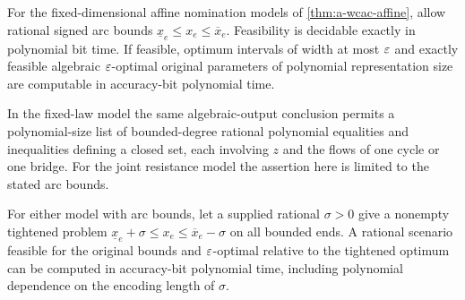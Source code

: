 \begin{theorem}
\label{thm:a-wcac-capacities}
For the fixed-dimensional affine nomination models of
\cref{thm:a-wcac-affine}, allow rational signed arc bounds
$\underline x_e\le x_e\le\overline x_e$. Feasibility is decidable exactly
in polynomial bit time. If feasible, optimum intervals of width at most
$\varepsilon$ and exactly feasible algebraic $\varepsilon$-optimal original parameters
of polynomial representation size are computable in accuracy-bit
polynomial time.

In the fixed-law model the same algebraic-output conclusion permits a
polynomial-size list of bounded-degree rational polynomial equalities and
inequalities defining a closed set, each involving $z$ and the flows of
one cycle or one bridge. For the joint resistance model the assertion
here is limited to the stated arc bounds.

For either model with arc bounds, let a supplied rational $\sigma>0$
give a nonempty tightened problem
$\underline x_e+\sigma\le x_e\le\overline x_e-\sigma$ on all bounded
ends. A rational scenario feasible for the original bounds and
$\varepsilon$-optimal relative to the tightened optimum can be computed in
accuracy-bit polynomial time, including polynomial dependence on the
encoding length of $\sigma$.
\end{theorem}
